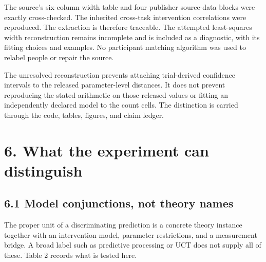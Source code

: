 \documentclass[
  11pt,
]{article}
\let\ctdoldsection\section
\renewcommand{\section}{\Needspace{8\baselineskip}\ctdoldsection}
\let\ctdoldsubsection\subsection
\renewcommand{\subsection}{\Needspace{6\baselineskip}\ctdoldsubsection}
\begin{document}
The source's six-column width table and four publisher source-data
blocks were exactly cross-checked. The inherited cross-task intervention
correlations were reproduced. The extraction is therefore traceable. The
attempted least-squares width reconstruction remains incomplete and is
included as a diagnostic, with its fitting choices and examples. No
participant matching algorithm was used to relabel people or repair the
source.

The unresolved reconstruction prevents attaching trial-derived
confidence intervals to the released parameter-level distances. It does
not prevent reproducing the stated arithmetic on those released values
or fitting an independently declared model to the count cells. The
distinction is carried through the code, tables, figures, and claim
ledger.

\hypertarget{what-the-experiment-can-distinguish}{%
\section{6. What the experiment can
distinguish}\label{what-the-experiment-can-distinguish}}

\hypertarget{model-conjunctions-not-theory-names}{%
\subsection{6.1 Model conjunctions, not theory
names}\label{model-conjunctions-not-theory-names}}

The proper unit of a discriminating prediction is a concrete theory
instance together with an intervention model, parameter restrictions,
and a measurement bridge. A broad label such as predictive processing or
UCT does not supply all of these. Table 2 records what is tested here.

\end{document}

